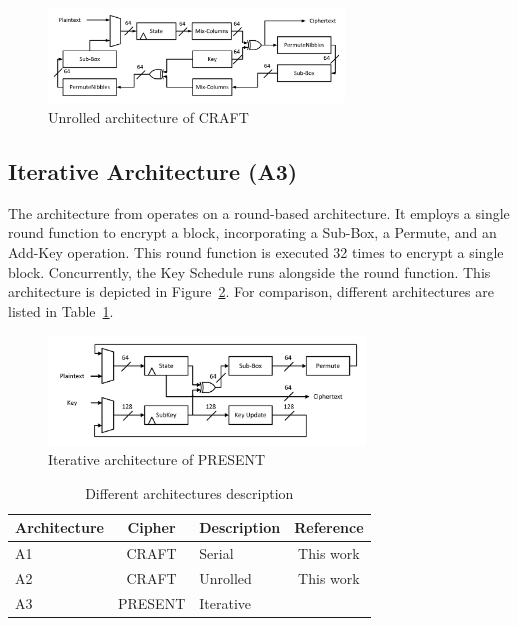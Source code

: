 \documentclass[final,5p,times,twocolumn]{elsarticle}
\begin{document}
\begin{figure}[h]%
    \centering
    \includegraphics[width=0.7\textwidth]{unrolled-archticture.pdf}
    \caption{Unrolled architecture of CRAFT}\label{fig4}
\end{figure}

\subsection{Iterative Architecture (A3)}\label{iterative_architecture}

The architecture from \cite{DBLP:journals/tcas/Lara-NinoDM17} operates on a round-based architecture.
It employs a single round function to encrypt a block, incorporating a Sub-Box, a Permute, and an Add-Key operation.
This round function is executed 32 times to encrypt a single block. Concurrently, the Key Schedule runs alongside the round function.
This architecture is depicted in Figure~\ref{fig5}.
For comparison, different architectures are listed in Table~\ref{tab2}.

\begin{figure}
    \centering
    \includegraphics[width=0.75\textwidth]{iteration-present.pdf}
    \caption{Iterative architecture of PRESENT}\label{fig5}
\end{figure}

\begin{table}[h]
    \centering
    \caption{Different architectures description}\label{tab2}%
    \begin{tabular}{lclc}
        \toprule
        Architecture & Cipher & Description & Reference  \\
        \midrule
        A1  & CRAFT & Serial & This work \\
        A2  & CRAFT & Unrolled & This work \\
        A3  & PRESENT & Iterative & \cite{DBLP:journals/tcas/Lara-NinoDM17} \\
        \bottomrule
    \end{tabular}
\end{table}
\end{document}
